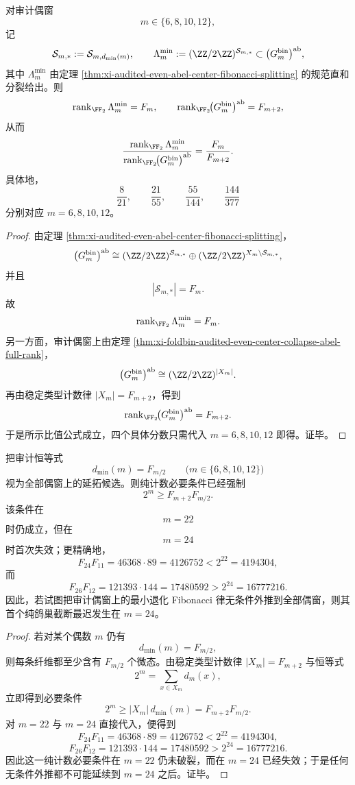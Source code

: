 \begin{corollary}\label{cor:xi-time-part69c-audited-even-minsector-abel-share}
对审计偶窗
\[
m\in\{6,8,10,12\},
\]
记
\[
\mathcal S_{m,*}:=\mathcal S_{m,d_{\min}(m)},
\qquad
\Lambda_m^{\min}:=(\ZZ/2\ZZ)^{\mathcal S_{m,*}}
\subset
\bigl(G_m^{\mathrm{bin}}\bigr)^{\mathrm{ab}},
\]
其中 \(\Lambda_m^{\min}\) 由定理 \ref{thm:xi-audited-even-abel-center-fibonacci-splitting} 的规范直和分裂给出。则
\[
\operatorname{rank}_{\FF_2}\Lambda_m^{\min}=F_m,
\qquad
\operatorname{rank}_{\FF_2}\!\bigl(G_m^{\mathrm{bin}}\bigr)^{\mathrm{ab}}=F_{m+2},
\]
从而
\[
\frac{\operatorname{rank}_{\FF_2}\Lambda_m^{\min}}
{\operatorname{rank}_{\FF_2}\!\bigl(G_m^{\mathrm{bin}}\bigr)^{\mathrm{ab}}}
=
\frac{F_m}{F_{m+2}}.
\]
具体地，
\[
\frac{8}{21},\qquad
\frac{21}{55},\qquad
\frac{55}{144},\qquad
\frac{144}{377}
\]
分别对应 \(m=6,8,10,12\)。
\end{corollary}
\begin{proof}
由定理 \ref{thm:xi-audited-even-abel-center-fibonacci-splitting}，
\[
\bigl(G_m^{\mathrm{bin}}\bigr)^{\mathrm{ab}}
\cong
(\ZZ/2\ZZ)^{\mathcal S_{m,*}}
\oplus
(\ZZ/2\ZZ)^{X_m\setminus\mathcal S_{m,*}},
\]
并且
\[
|\mathcal S_{m,*}|=F_m.
\]
故
\[
\operatorname{rank}_{\FF_2}\Lambda_m^{\min}=F_m.
\]
另一方面，审计偶窗上由定理 \ref{thm:xi-foldbin-audited-even-center-collapse-abel-full-rank}，
\[
\bigl(G_m^{\mathrm{bin}}\bigr)^{\mathrm{ab}}
\cong
(\ZZ/2\ZZ)^{|X_m|}.
\]
再由稳定类型计数律 \(|X_m|=F_{m+2}\)，得到
\[
\operatorname{rank}_{\FF_2}\!\bigl(G_m^{\mathrm{bin}}\bigr)^{\mathrm{ab}}=F_{m+2}.
\]
于是所示比值公式成立，四个具体分数只需代入 \(m=6,8,10,12\) 即得。证毕。
\end{proof}

\begin{theorem}\label{thm:xi-time-part69c-minsector-fib-extension-pigeonhole-cutoff}
把审计恒等式
\[
d_{\min}(m)=F_{m/2}
\qquad
\bigl(m\in\{6,8,10,12\}\bigr)
\]
视为全部偶窗上的延拓候选。则纯计数必要条件已经强制
\[
2^m\ge F_{m+2}F_{m/2}.
\]
该条件在
\[
m=22
\]
时仍成立，但在
\[
m=24
\]
时首次失效；更精确地，
\[
F_{24}F_{11}=46368\cdot 89=4126752<2^{22}=4194304,
\]
而
\[
F_{26}F_{12}=121393\cdot 144=17480592>2^{24}=16777216.
\]
因此，若试图把审计偶窗上的最小退化 Fibonacci 律无条件外推到全部偶窗，则其首个纯鸽巢截断最迟发生在 \(m=24\)。
\end{theorem}
\begin{proof}
若对某个偶数 \(m\) 仍有
\[
d_{\min}(m)=F_{m/2},
\]
则每条纤维都至少含有 \(F_{m/2}\) 个微态。由稳定类型计数律 \(|X_m|=F_{m+2}\) 与恒等式
\[
2^m=\sum_{x\in X_m}d_m(x),
\]
立即得到必要条件
\[
2^m\ge |X_m|\,d_{\min}(m)=F_{m+2}F_{m/2}.
\]
对 \(m=22\) 与 \(m=24\) 直接代入，便得到
\[
F_{24}F_{11}=46368\cdot 89=4126752<2^{22}=4194304,
\]
\[
F_{26}F_{12}=121393\cdot 144=17480592>2^{24}=16777216.
\]
因此这一纯计数必要条件在 \(m=22\) 仍未破裂，而在 \(m=24\) 已经失效；于是任何无条件外推都不可能延续到 \(m=24\) 之后。证毕。
\end{proof}

